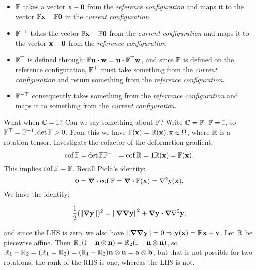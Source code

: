 \documentclass[reqno, a4paper]{article}
\begin{document}
\begin{itemize}
	\item $\mathbb{F}$ takes a vector $\vb{x}-\vb{0}$ from the \textit{reference configuration} and maps it to the vector $\mathbb{F} \vb{x}- \mathbb{F} \vb{0}$ in the \textit{current configuration}
	\item $\mathbb{F}^{-1}$ takes the vector $\mathbb{F} \vb{x} - \mathbb{F} \vb{0}$ from the \textit{current configuration} and maps it to the vector $\vb{x}-\vb{0}$ from the \textit{reference configuration}
	\item $\mathbb{F}^\top$ is defined through: $\fgrad \vb{u} \vdot \vb{w} = \vb{u} \vdot \transpose{\fgrad}\vb{w}$, and since $\mathbb{F}$ is defined on the reference configuration, $\mathbb{F}^\top$ must take something from the \textit{current configuration} and return something from the \textit{reference configuration}.
	\item $\mathbb{F}^{-\top}$ consequently takes something from the \textit{referrence configuration} and maps it to something from the \textit{current configuration}.
\end{itemize}	
\begin{example}
	What when $\mathbb{C} = \mathbb{I}$? Can we say something about $\mathbb{F}$? Write $\mathbb{C} = \mathbb{F}^\top\mathbb{F} = \mathbb{I}$, so $\mathbb{F}^\top = \mathbb{F}^{-1}, \det \mathbb{F} > 0$. From this we have $\mathbb{F}(\vb{x}) = \mathbb{R}(\vb{x}), \vb{x} \in \Omega$, where $\mathbb{R}$ is a rotation tensor. Investigate the cofactor of the deformation gradient:
	\[
		\operatorname{cof} \mathbb{F} = \det \mathbb{F} \mathbb{F}^{-\top} = \operatorname{cof} \mathbb{R} = 1 \mathbb{R}(\vb{x}) = \mathbb{F} (\vb{x}).
	\]
This implies $\operatorname{cof} \mathbb{F} = \mathbb{F}$. Recall Piola's identity:
\[
	\vb{0} = \divergence{\cof \fgrad} = \divergence{\fgrad (\vb{x})} = \laplacian \vb{y}(\vb{x}).
\]
We have the identity:

\begin{equation}
	\frac{1}{2}(\norm{\grad\vb{y}})^{2} = \norm{\grad \grad \vb{y}}^{2} + \grad{\vb{y}} \vdot \grad \laplacian \vb{y},
\end{equation}

and since the LHS is zero, we also have $\norm{\grad \grad \vb{y}} = 0 \Rightarrow \vb{y}(\vb{x}) = \mathbb{R}\vb{x}+\vb{v}$.
Let $\mathbb{R}$ be piecewise affine. Then $\mathbb{R}_1 (\mathbb{I} - \vb{n} \otimes \vb{n}) = \mathbb{R}_2(\mathbb{I} - \vb{n}\otimes \vb{n})$, so $\mathbb{R}_1 - \mathbb{R}_2 = (\mathbb{R}_1 = \mathbb{R}_2) = (\mathbb{R}_1 - \mathbb{R}_2) \vb{n} \otimes \vb{n} = \vb{a} \otimes \vb{b}$, but that is not possible for two rotations; the rank of the RHS is one, whereas the LHS is not.
\end{example}
\end{document}
